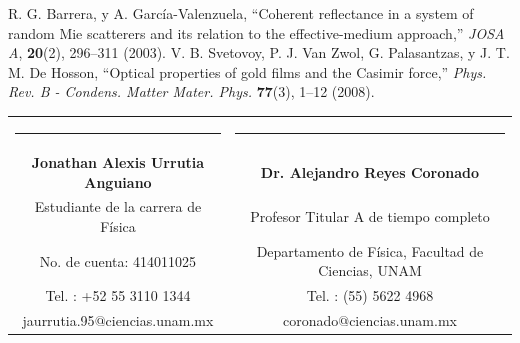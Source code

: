 \documentclass[letterpaper,11pt] {article}
\begin{document}
\begin{thebibliography}{     }
%
  R.  G.  Barrera, y A.  García-Valenzuela, ``Coherent reflectance in a system of random Mie scatterers and its relation to the effective-medium approach,'' \emph{JOSA A}, \textbf{20}(2), 296–311 (2003).
%
  V. B. Svetovoy, P. J. Van Zwol, G. Palasantzas, y J. T. M. De Hosson, ``Optical properties of gold films and the Casimir force,'' \emph{Phys. Rev. B - Condens. Matter Mater. Phys.} \textbf{77}(3), 1–12 (2008).
% 

\end{thebibliography}

\vspace{5cm}

\begin{center}
\begin{tabular} { c c }
\setlength{\tabcolsep}{15pt}
\renewcommand{\arraystretch}{1.5}
 \qquad \noindent\rule{6cm}{0.4pt}\qquad 		& \qquad \noindent\rule{6cm}{0.4pt}\qquad \\
 \qquad \textbf{Jonathan Alexis Urrutia Anguiano}  \qquad 		&    \qquad  \textbf{Dr.  Alejandro Reyes Coronado} \qquad \\
 \qquad Estudiante de la carrera de Física \qquad &  \qquad  Profesor Titular A de tiempo completo \qquad \\
\qquad No.  de cuenta: 414011025  \qquad 			& 	\qquad   Departamento de F\'isica, Facultad de Ciencias, UNAM \qquad \\
\qquad Tel. : +52 55 3110 1344 \qquad				& 	 \qquad Tel. : (55) 5622 4968\qquad \\
\qquad jaurrutia.95$@$ciencias.unam.mx	\qquad			&			\qquad  coronado$@$ciencias.unam.mx \qquad 
\end{tabular}
\end{center}
\end{document}
